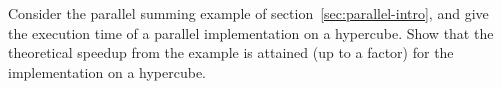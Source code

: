   Consider the parallel summing example of
  section~\ref{sec:parallel-intro}, and give the execution time of a
  parallel implementation on a
  hypercube. Show that
  the theoretical speedup from the example is attained (up to a
  factor) for the implementation on a hypercube.

